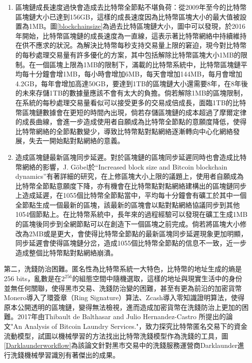 					\begin{enumerate}
						\item 區塊鏈成長速度過快會造成去比特幣全節點不堪負荷：從2009年至今的比特幣區塊鏈大小已達到156GB，這樣的成長速度因為比特幣區塊大小的最大值被設置為1MB。圖\ref{blockchainsize}為過去比特區塊鏈大小，圖中可以發現，於2016年開始，比特幣區塊鏈的成長速度為一直線，這表示著比特幣網絡中持續維持在供不應求的狀況。為解決比特幣每秒⽀持交易量上限的窘迫，現今對⽐特幣的每秒處理交易量有許多優化的⽅案，其中包括解除比特幣區塊大小1MB的限制。在一個區塊上限為1MB的限制下，滿載的比特幣系統中，比特幣區塊鏈平均每十分鐘會增1MB，每小時會增加6MB，每天會增加144MB，每月會增加4.2GB，每年會增加高達50GB，要達到1TB的區塊鏈大小還需要8年，在8年後的未來存儲1TB的數據量應該不會有太大的負擔。倘若解除1MB的區塊限制，在系統的每秒處理交易量看似可以接受更多的交易成倍成長，面臨1TB的比特幣區塊鏈數據會在更短的時間內出現，倘若存儲區塊鏈的成本超過了摩爾定律的成長曲線，會進一步造成使用者自願成為比特幣全節點的意願度降低，使得比特幣網絡的全節點數變少，導致比特幣點對點網絡逐漸轉向中心化網絡發展，失去一開始點對點網絡的意義。

						\item 造成區塊鏈最新區塊同步延遲。對於區塊鏈的區塊同步延遲同時也會造成比特幣網絡的影響，J. Göbel於“Increased block size and Bitcoin blockchain dynamics”\supercite{TelecommunicationNetworksandApplicationsConferenceITNAC201727thInternational}有著詳細的研究，在上修區塊大小上限的議題上，使用者自願成為比特幣全節點意願度下降，亦有機會在比特幣點對點網絡建構出的區塊鏈同步上造成延遲，在1055個比特幣全節點當中，平均每十分鐘會有礦工於其中一個全節點生成一個最新的區塊，該最新的區塊會以點對點網絡協議同步到其他1054個節點上。在比特幣系統中，長年來的過程經驗可以發現在礦工生成1MB的區塊後同步到全網節點可以在創造下一個區塊之前完成。倘若將區塊大小修改為2MB或是更大，會使得比特幣全節點的最新區塊同步延遲現象更加明顯，同步延遲會使得區塊鏈分岔，造成1055個比特幣全節點的信息不一致，近一步造成整個比特幣點對點網絡崩潰。
					\end{enumerate}
					

				第二，洗錢防治困難。匿名性為比特幣系統一大特色，比特幣的地址生成的熵是256 bits，亂數是在$2^{256}$的組態空間中隨機選取，這樣的地址與現實生活中的身份並無任何關聯，使得黑市交易、洗錢防治變的困難，甚至有更為前沿的加密貨幣Monero\supercite{noether2014monero}導入了環簽章（Ring Signature）\supercite{Thresholdringsignaturesandapplicationstoad-hocgroups}算法、Zcash\supercite{zhong2002faster}導入零知識證明算法\supercite{Zero-KnowledgeProofsofIdentity}，使得原本公開透明的區塊鏈，變得無法檢視，進而造成加密貨幣在洗錢防治上更加的困難。2017年由Thibault de Balthasar and Julio Hernandez-Castro 所提出的論文"An Analysis of Bitcoin Laundry Services."\supercite{AnAnalysisofBitcoinLaundryServices}，致⼒探究⽐特幣匿名交易下的資⾦流動模型，試圖以機械學習的方法找出比特幣洗錢模型作為洗錢的工具，圖\ref{Darklaunderworkflow}為該論文針對黑市交易中的洗錢服務運營商Darklaunder進行洗錢機械學習識別有著傑出的成果。

